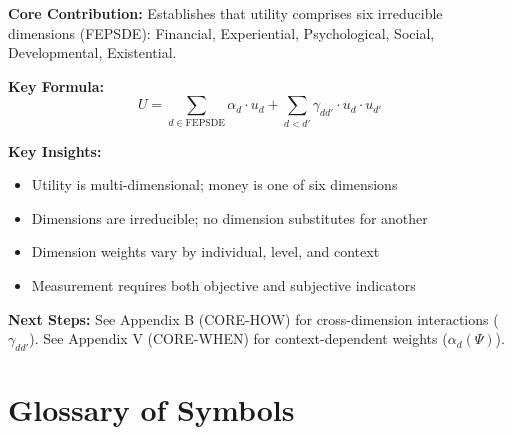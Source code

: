 \begin{tcolorbox}[colback=gray!5!white, colframe=gray!75!black,
    title=Appendix C Summary: CORE-WHAT]

\textbf{Core Contribution:}
Establishes that utility comprises six irreducible dimensions (FEPSDE):
Financial, Experiential, Psychological, Social, Developmental, Existential.

\textbf{Key Formula:}
\begin{equation}
U = \sum_{d \in \text{FEPSDE}} \alpha_d \cdot u_d + \sum_{d < d'} \gamma_{dd'} \cdot u_d \cdot u_{d'}
\end{equation}

\textbf{Key Insights:}
\begin{itemize}[nosep]
\item Utility is multi-dimensional; money is one of six dimensions
\item Dimensions are irreducible; no dimension substitutes for another
\item Dimension weights vary by individual, level, and context
\item Measurement requires both objective and subjective indicators
\end{itemize}

\textbf{Next Steps:}
See Appendix B (CORE-HOW) for cross-dimension interactions ($\gamma_{dd'}$).
See Appendix V (CORE-WHEN) for context-dependent weights ($\alpha_d(\Psi)$).

\end{tcolorbox}


\section{Glossary of Symbols}
\label{sec:what-glossary}

